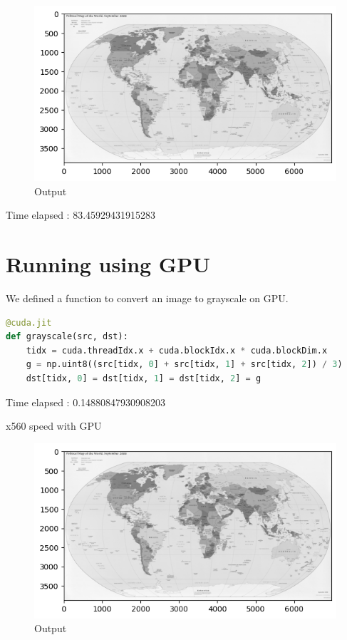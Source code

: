 \documentclass{article}
\begin{document}
\begin{figure}[H]
    \centering
    \includegraphics[width=1\linewidth]{output2.png}
    \caption{Output}
    \label{fig:enter-label}
\end{figure}


Time elapsed :   83.45929431915283

\section{Running using GPU}

We defined a function to convert an image to grayscale on GPU.
\begin{lstlisting}[language=Python]
@cuda.jit
def grayscale(src, dst):
    tidx = cuda.threadIdx.x + cuda.blockIdx.x * cuda.blockDim.x
    g = np.uint8((src[tidx, 0] + src[tidx, 1] + src[tidx, 2]) / 3)
    dst[tidx, 0] = dst[tidx, 1] = dst[tidx, 2] = g
\end{lstlisting}

Time elapsed :  0.14880847930908203

x560 speed with GPU

\begin{figure}[H]
    \centering
    \includegraphics[width=1\linewidth]{output2.png}
    \caption{Output}
    \label{fig:enter-label}
\end{figure}
\end{document}
